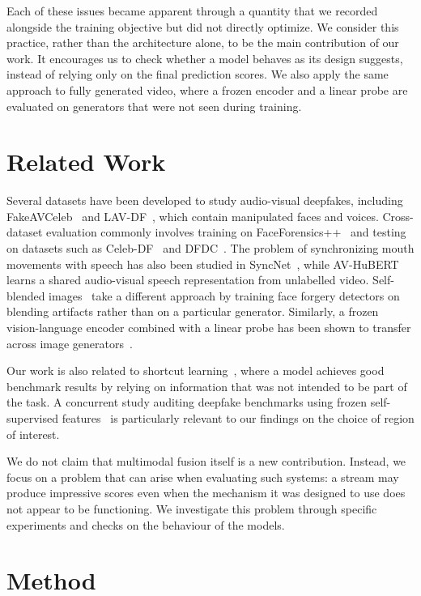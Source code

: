 \documentclass[conference]{IEEEtran}
\begin{document}
Each of these issues became apparent through a quantity that we recorded
alongside the training objective but did not directly optimize. We consider
this practice, rather than the architecture alone, to be the main contribution
of our work. It encourages us to check whether a model behaves as its design
suggests, instead of relying only on the final prediction scores. We also
apply the same approach to fully generated video, where a frozen encoder and
a linear probe are evaluated on generators that were not seen during
training.

\section{Related Work}

Several datasets have been developed to study audio-visual deepfakes,
including FakeAVCeleb~\cite{fakeavceleb} and LAV-DF~\cite{lavdf}, which
contain manipulated faces and voices. Cross-dataset evaluation commonly
involves training on FaceForensics++~\cite{ffpp} and testing on datasets such
as Celeb-DF~\cite{celebdf} and DFDC~\cite{dfdc}. The problem of synchronizing
mouth movements with speech has also been studied in SyncNet~\cite{syncnet},
while AV-HuBERT~\cite{avhubert} learns a shared audio-visual speech
representation from unlabelled video. Self-blended images~\cite{sbi} take a
different approach by training face forgery detectors on blending artifacts
rather than on a particular generator. Similarly, a frozen vision-language
encoder combined with a linear probe has been shown to transfer across image
generators~\cite{univfd}.

Our work is also related to shortcut learning~\cite{shortcut}, where a model
achieves good benchmark results by relying on information that was not
intended to be part of the task. A concurrent study auditing deepfake
benchmarks using frozen self-supervised features~\cite{audit} is particularly
relevant to our findings on the choice of region of interest.

We do not claim that multimodal fusion itself is a new contribution. Instead,
we focus on a problem that can arise when evaluating such systems: a stream
may produce impressive scores even when the mechanism it was designed to use
does not appear to be functioning. We investigate this problem through
specific experiments and checks on the behaviour of the models.

\section{Method}
\end{document}
